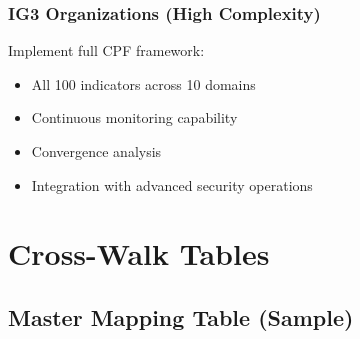 \documentclass[11pt,a4paper]{article}
\begin{document}
\subsubsection{IG3 Organizations (High Complexity)}

Implement full CPF framework:

\begin{itemize}
\item All 100 indicators across 10 domains
\item Continuous monitoring capability
\item Convergence analysis
\item Integration with advanced security operations
\end{itemize}

\section{Cross-Walk Tables}

\subsection{Master Mapping Table (Sample)}
\end{document}

